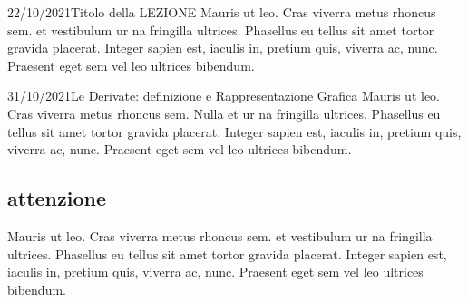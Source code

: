 \documentclass[10pt, twoside, notitlepage, notoc, justified]{tufte-handout}
\begin{document}
\begin{loggentry}{22/10/2021}{Titolo della LEZIONE}
Mauris ut leo. Cras viverra metus rhoncus sem. et  vestibulum ur na fringilla ultrices. Phasellus eu tellus sit amet tortor gravida placerat. Integer sapien est, iaculis in, pretium quis, viverra ac, nunc. Praesent eget sem vel leo ultrices bibendum.\\

\end{loggentry}

\begin{loggentry}{31/10/2021}{Le Derivate: definizione e Rappresentazione Grafica}
Mauris ut leo. Cras viverra metus rhoncus sem. 
Nulla et ur na fringilla ultrices. Phasellus eu tellus sit amet tortor gravida placerat. Integer sapien est, iaculis in, pretium quis, viverra ac, nunc. Praesent eget sem vel leo ultrices bibendum.\\
\subsection{attenzione} 
Mauris ut leo. Cras viverra metus rhoncus sem.  et vestibulum ur na fringilla ultrices. Phasellus eu tellus sit amet tortor gravida placerat. Integer sapien est, iaculis in, pretium quis, viverra ac, nunc. Praesent eget sem vel leo ultrices bibendum.\\
\end{loggentry}
\end{document}
